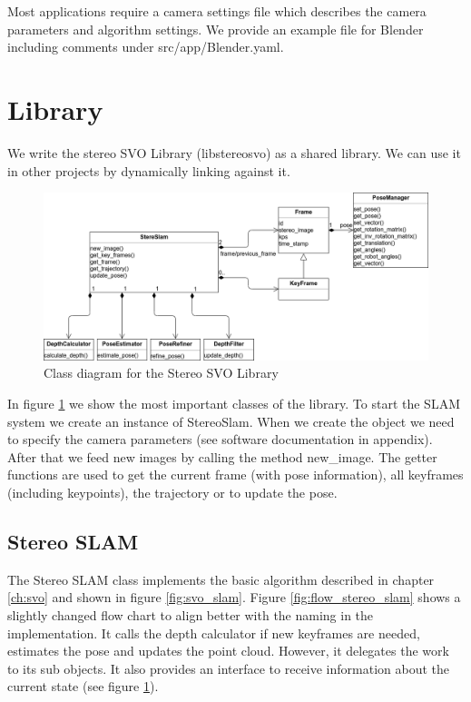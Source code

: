 \documentclass[11pt,a4paper,titlepage,oneside]{report}
\begin{document}
Most applications require a camera settings file which describes the camera parameters and algorithm settings. We provide an example file for Blender including comments under src/app/Blender.yaml.

\section{Library}

We write the stereo SVO Library (libstereosvo) as a shared library. We can use it in other projects by dynamically linking against it.
\begin{figure}[H]
  \centering
  \includegraphics[width=1.0\textwidth]{img/class_diagram.png}
  \caption{Class diagram for the Stereo SVO Library}\label{fig:class_diagram}
\end{figure}

In figure \ref{fig:class_diagram} we show the most important classes of the library. To start the SLAM system we create an instance of StereoSlam. When we create the object we need to specify the camera parameters (see software documentation in appendix). After that we feed new images by calling the method new\_image. The getter functions are used to get the current frame (with pose information), all keyframes (including keypoints), the trajectory or to update the pose.

\subsection{Stereo SLAM}

The Stereo SLAM class implements the basic algorithm described in chapter \ref{ch:svo} and shown in figure \ref{fig:svo_slam}. Figure \ref{fig:flow_stereo_slam} shows a slightly changed flow chart to align better with the naming in the implementation. It calls the depth calculator if new keyframes are needed, estimates the pose and updates the point cloud. However, it delegates the work to its sub objects. It also provides an interface to receive information about the current state (see figure \ref{fig:class_diagram}).
\end{document}
